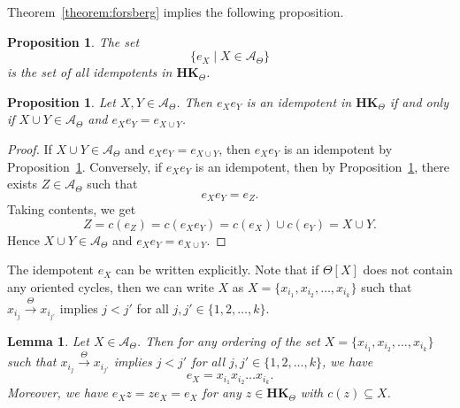 \documentclass[pdflatex,sn-mathphys-num]{sn-jnl}
\newcommand{\hk}{\mathbf{HK}_{\Theta}}
\newcommand{\tot}{\overset{\Theta}{\to}}
\newtheorem{lemma}[theorem]{Lemma}
\newtheorem{proposition}[theorem]{Proposition}
\theoremstyle{definition}
\theoremstyle{remark}
\begin{document}
Theorem~\ref{theorem:forsberg} implies the following proposition.
\begin{proposition}\label{proposition:idempotents}
   The set 
   \[
   \{e_X \mid X \in \mathcal{A}_{\Theta} \}
   \]
   is the set of all idempotents in $\hk$.
\end{proposition}

\begin{proposition}\label{hk_idempotents}
    Let $X, Y \in \mathcal{A}_{\Theta}$.
    Then $e_X e_Y$ is an idempotent in $\hk$ if and only if $X \cup Y \in \mathcal{A}_{\Theta}$ and $e_X e_Y = e_{X \cup Y}$.
\end{proposition}

\begin{proof}
    If $X \cup Y \in \mathcal{A}_{\Theta}$ and $e_X e_Y = e_{X \cup Y}$, then $e_X e_Y$ is an idempotent by Proposition~\ref{proposition:idempotents}.
    Conversely, if $e_X e_Y$ is an idempotent, then by Proposition~\ref{proposition:idempotents}, there exists $Z \in \mathcal{A}_{\Theta}$ such that 
    \[
    e_X e_Y = e_Z.
    \]
    Taking contents, we get 
    \[
    Z = c(e_Z) = c(e_X e_Y) = c(e_X) \cup c(e_Y) = X \cup Y. 
    \]
    Hence $X \cup Y \in \mathcal{A}_{\Theta}$ and $e_X e_Y = e_{X \cup Y}$.
\end{proof}

The idempotent $e_X$ can be written explicitly.
Note that if $\Theta[X]$ does not contain any oriented cycles, then we can write $X$ as $X = \{x_{i_1}, x_{i_2}, \dots, x_{i_k}\}$ such that
$x_{i_j} \tot x_{i_{j'}}$ implies $j < j'$ for all $j, j' \in \{1, 2, \dots, k\}$.

\begin{lemma}\label{idempotent:formula}
   Let $X \in \mathcal{A}_{\Theta}$.
   Then for any ordering of the set $X = \{x_{i_1}, x_{i_2}, \dots, x_{i_k}\}$ such that $x_{i_j} \tot x_{i_{j'}}$ implies $j < j'$ for all $j, j' \in \{1, 2, \dots, k\}$, we have
   \[
   e_X = x_{i_1} x_{i_2} \dots x_{i_k}.
   \]
   Moreover, we have $e_X z = z e_X = e_X$ for any $z \in \hk$ with $c(z) \subseteq X$.
\end{lemma}
\end{document}
